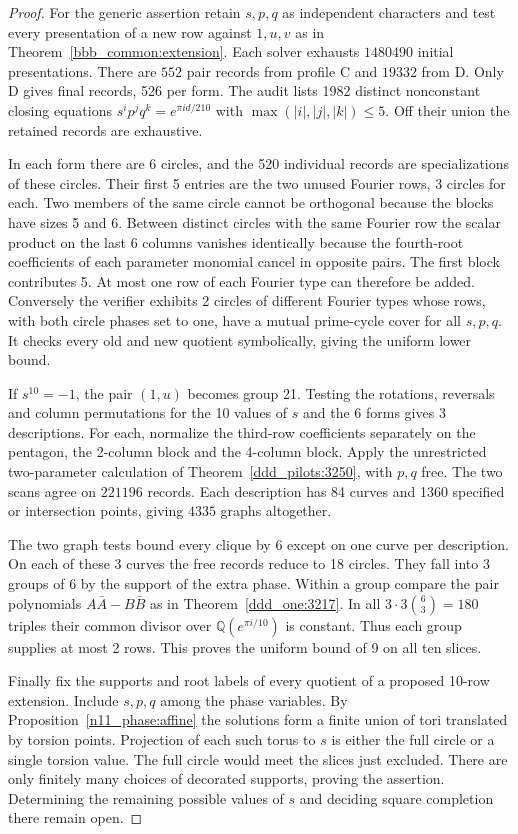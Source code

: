 \documentclass[11pt,a4paper]{article}
\theoremstyle{plain}
\theoremstyle{definition}
\theoremstyle{plain}
\begin{document}
\begin{proof}
For the generic assertion retain $s,p,q$ as independent characters and test every presentation of a new row against $1,u,v$ as in Theorem~\ref{bbb_common:extension}. Each solver exhausts $1480490$ initial presentations. There are $552$ pair records from profile $\mathrm{C}$ and $19332$ from $\mathrm{D}$. Only $\mathrm{D}$ gives final records, 526 per form. The audit lists 1982 distinct nonconstant closing equations $s^i p^j q^k=e^{\pi i d/210}$ with $\max(|i|,|j|,|k|)\le5$. Off their union the retained records are exhaustive.

In each form there are 6 circles, and the 520 individual records are specializations of these circles. Their first 5 entries are the two unused Fourier rows, 3 circles for each. Two members of the same circle cannot be orthogonal because the blocks have sizes 5 and 6. Between distinct circles with the same Fourier row the scalar product on the last 6 columns vanishes identically because the fourth-root coefficients of each parameter monomial cancel in opposite pairs. The first block contributes 5. At most one row of each Fourier type can therefore be added. Conversely the verifier exhibits 2 circles of different Fourier types whose rows, with both circle phases set to one, have a mutual prime-cycle cover for all $s,p,q$. It checks every old and new quotient symbolically, giving the uniform lower bound.

If $s^{10}=-1$, the pair $(1,u)$ becomes group 21. Testing the rotations, reversals and column permutations for the 10 values of $s$ and the 6 forms gives 3 descriptions. For each, normalize the third-row coefficients separately on the pentagon, the 2-column block and the 4-column block. Apply the unrestricted two-parameter calculation of Theorem~\ref{ddd_pilots:3250}, with $p,q$ free. The two scans agree on $221196$ records. Each description has 84 curves and 1360 specified or intersection points, giving $4335$ graphs altogether.

The two graph tests bound every clique by 6 except on one curve per description. On each of these 3 curves the free records reduce to 18 circles. They fall into 3 groups of 6 by the support of the extra phase. Within a group compare the pair polynomials $A\bar A-B\bar B$ as in Theorem~\ref{ddd_one:3217}. In all $3\cdot3\binom63=180$ triples their common divisor over $\mathbb Q(e^{\pi i/10})$ is constant. Thus each group supplies at most 2 rows. This proves the uniform bound of 9 on all ten slices.

Finally fix the supports and root labels of every quotient of a proposed 10-row extension. Include $s,p,q$ among the phase variables. By Proposition~\ref{n11_phase:affine} the solutions form a finite union of tori translated by torsion points. Projection of each such torus to $s$ is either the full circle or a single torsion value. The full circle would meet the slices just excluded. There are only finitely many choices of decorated supports, proving the assertion. Determining the remaining possible values of $s$ and deciding square completion there remain open.
\end{proof}
\end{document}
